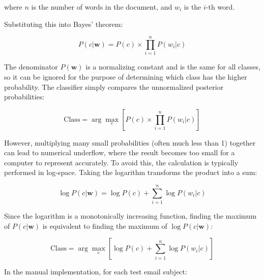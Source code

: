 \documentclass[12pt,letterpaper]{article}
\begin{document}
where $n$ is the number of words in the document, and $w_i$ is the $i$-th word.

Substituting this into Bayes' theorem:

\begin{equation}
P(c | \mathbf{w}) = P(c) \times \prod_{i=1}^{n} P(w_i | c)
\end{equation}

The denominator $P(\mathbf{w})$ is a normalizing constant and is the same for all classes, so it can be ignored for the purpose of determining which class has the higher probability. The classifier simply compares the unnormalized posterior probabilities:

\begin{equation}
\text{Class} = \arg\max_{c} \left[ P(c) \times \prod_{i=1}^{n} P(w_i | c) \right]
\end{equation}

However, multiplying many small probabilities (often much less than 1) together can lead to numerical underflow, where the result becomes too small for a computer to represent accurately. To avoid this, the calculation is typically performed in log-space. Taking the logarithm transforms the product into a sum:

\begin{equation}
\log P(c | \mathbf{w}) = \log P(c) + \sum_{i=1}^{n} \log P(w_i | c)
\end{equation}

Since the logarithm is a monotonically increasing function, finding the maximum of $P(c | \mathbf{w})$ is equivalent to finding the maximum of $\log P(c | \mathbf{w})$:

\begin{equation}
\text{Class} = \arg\max_{c} \left[ \log P(c) + \sum_{i=1}^{n} \log P(w_i | c) \right]
\end{equation}

In the manual implementation, for each test email subject:
\end{document}
